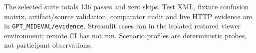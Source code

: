 The selected suite totals 136 passes and zero skips. Test XML, fixture confusion matrix, artifact/source validation, comparator audit and live HTTP evidence are in \texttt{GPT\_MIDEVAL/evidence}. Streamlit cases ran in the isolated restored viewer environment; remote CI has not run. Scenario profiles are deterministic probes, not participant observations.
